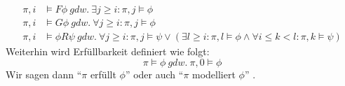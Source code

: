 \begin{equation*}
\begin{split}
    \pi, i &\models F\phi\ gdw.\ \exists j \geq i: \pi, j \models \phi\\
    \pi, i &\models G\phi \ gdw.\ \forall j \geq i: \pi, j \models \phi\\
    \pi, i &\models \phi R\psi\ gdw.\ \forall j \geq i: \pi, j \models \psi \lor (\exists l \geq i: \pi, l \models \phi \land \forall i \leq k < l: \pi, k \models \psi)
\end{split}
\end{equation*}
Weiterhin wird Erfüllbarkeit definiert wie folgt: 
\[
    \pi \models \phi\ gdw.\ \pi, 0 \models \phi
\]
Wir sagen dann "`$\pi$ erfüllt $\phi$"' oder auch "`$\pi$ modelliert $\phi$"' \cite{vardi+96}.

